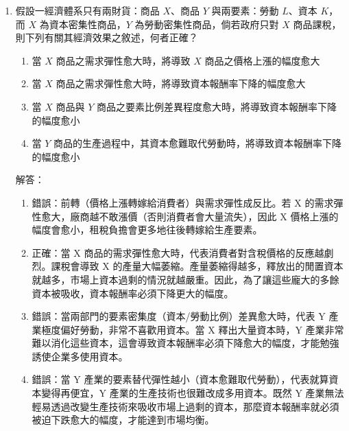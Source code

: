 \documentclass[12pt, a4paper]{article}
\begin{document}
\begin{enumerate}
    \item 假設一經濟體系只有兩財貨：商品 \(X\)、商品 \(Y\) 與兩要素：勞動 \(L\)、資本 \(K\)，而 \(X\) 為資本密集性商品，\(Y\) 為勞動密集性商品，倘若政府只對 \(X\) 商品課稅，則下列有關其經濟效果之敘述，何者正確？
    \begin{enumerate}[label=\Alph*.]
        \item 當 \(X\) 商品之需求彈性愈大時，將導致 \(X\) 商品之價格上漲的幅度愈大
        \item 當 \(X\) 商品之需求彈性愈大時，將導致資本報酬率下降的幅度愈大
        \item 當 \(X\) 商品與 \(Y\) 商品之要素比例差異程度愈大時，將導致資本報酬率下降的幅度愈小
        \item 當 \(Y\) 商品的生產過程中，其資本愈難取代勞動時，將導致資本報酬率下降的幅度愈小
    \end{enumerate}
    解答：
    \begin{enumerate}[label=\Alph*.]
        \item 錯誤：前轉（價格上漲轉嫁給消費者）與需求彈性成反比。若 X 的需求彈性愈大，廠商越不敢漲價（否則消費者會大量流失），因此 X 價格上漲的幅度會愈小，租稅負擔會更多地往後轉嫁給生產要素。
        \item 正確：當 X 商品的需求彈性愈大時，代表消費者對含稅價格的反應越劇烈。課稅會導致 X 的產量大幅萎縮。產量萎縮得越多，釋放出的閒置資本就越多，市場上資本過剩的情況就越嚴重。因此，為了讓這些龐大的多餘資本被吸收，資本報酬率必須下降更大的幅度。
        \item 錯誤：當兩部門的要素密集度（資本/勞動比例）差異愈大時，代表 Y 產業極度偏好勞動，非常不喜歡用資本。當 X 釋出大量資本時，Y 產業非常難以消化這些資本，這會導致資本報酬率必須下降愈大的幅度，才能勉強誘使企業多使用資本。
        \item 錯誤：當 Y 產業的要素替代彈性越小（資本愈難取代勞動），代表就算資本變得再便宜，Y 產業的生產技術也很難改成多用資本。既然 Y 產業無法輕易透過改變生產技術來吸收市場上過剩的資本，那麼資本報酬率就必須被迫下跌愈大的幅度，才能達到市場均衡。
    \end{enumerate}


\end{enumerate}
\end{document}
